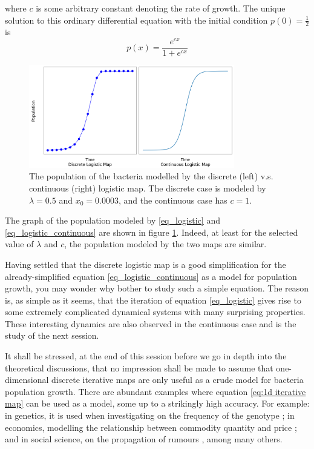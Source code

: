 where $c$ is some arbitrary constant denoting the rate of growth. 
The unique solution to this ordinary differential equation with the initial condition $p(0) = \frac{1}{2}$ is 
$$
p(x) = \frac{e^{cx}}{1+e^{cx}}
$$
\begin{figure}
	\centering
	\includegraphics[width=0.8\textwidth]{./figures/con_vs_discrete_logistic_map.png}
	\caption{The population of the bacteria modelled by the discrete (left) v.s. continuous (right) logistic map. 
	The discrete case is modeled by $\lambda = 0.5$ and $x_0 = 0.0003$, and the continuous case has $c=1$.}
	\label{fig:con_vs_discrete}
\end{figure}

The graph of the population modeled by \eqref{eq_logistic} and \eqref{eq_logistic_continuous} are shown in figure \ref{fig:con_vs_discrete}.
Indeed, at least for the selected value of $\lambda$ and $c$, the population modeled by the two maps are similar.

Having settled that the discrete logistic map is a good simplification for the already-simplified equation \ref{eq_logistic_continuous} as a model for population growth, you may wonder why bother to study such a simple equation. 
The reason is, as simple as it seems, that the iteration of equation \ref{eq_logistic} gives rise to some extremely complicated dynamical systems with many surprising properties. 
These interesting dynamics are also observed in the continuous case and is the study of the next session.

It shall be stressed, at the end of this session before we go in depth into the theoretical discussions, that no impression shall be made to assume that one-dimensional discrete iterative maps are only useful as a crude model for bacteria population growth. 
There are abundant examples where equation \eqref{eq:1d iterative map} can be used as a model, some up to a strikingly high accuracy. 
For example: in genetics, it is used when investigating on the frequency of the genotype \cite{genotype}; in economics, modelling the relationship between commodity quantity and price \cite{economics}; and in social science, on the propagation of rumours \cite{social_science}, among many others.


